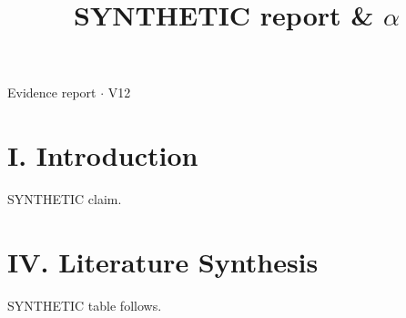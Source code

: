 \documentclass[journal]{IEEEtran}
\begin{document}
\title{SYNTHETIC report \& \ensuremath{\alpha}}

\maketitle

\noindent Evidence report \ensuremath{\cdot} V12

\section*{I. Introduction}

SYNTHETIC claim. \cite{Synth26}

\section*{IV. Literature Synthesis}

SYNTHETIC table follows.
\end{document}
